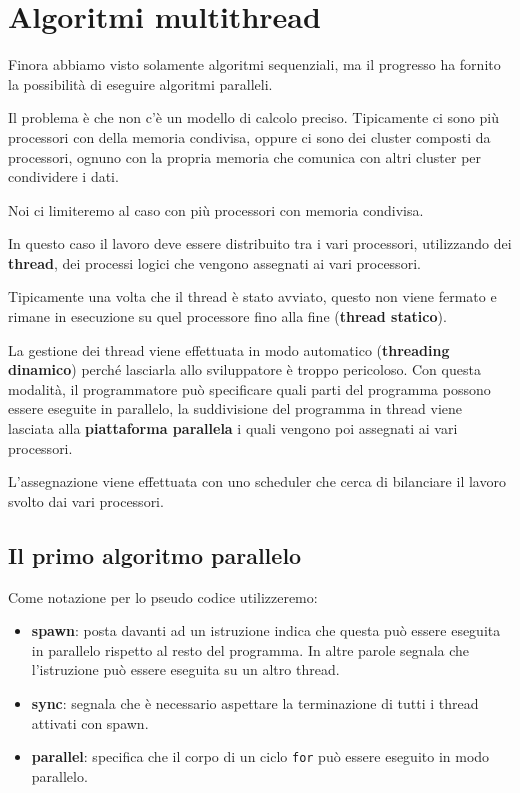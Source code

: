 \chapter{Algoritmi multithread}\label{algoritmi-multithread}

Finora abbiamo visto solamente algoritmi sequenziali, ma il progresso ha fornito la possibilità di eseguire algoritmi paralleli.

Il problema è che non c'è un modello di calcolo preciso. 
Tipicamente ci sono più processori con della memoria condivisa, oppure ci sono dei cluster composti da processori, ognuno con la propria memoria che comunica con altri cluster per condividere i dati.

Noi ci limiteremo al caso con più processori con memoria condivisa.

In questo caso il lavoro deve essere distribuito tra i vari processori, utilizzando dei \textbf{thread}, dei processi logici che vengono assegnati ai vari processori.

Tipicamente una volta che il thread è stato avviato, questo non viene fermato e rimane in esecuzione su quel processore fino alla fine (\textbf{thread statico}).

La gestione dei thread viene effettuata in modo automatico (\textbf{threading dinamico}) perché lasciarla allo sviluppatore è troppo pericoloso. 
Con questa modalità, il programmatore può specificare quali parti del programma possono essere eseguite in parallelo, la suddivisione del programma in thread viene lasciata alla \textbf{piattaforma parallela} i quali vengono poi assegnati ai vari processori.

L'assegnazione viene effettuata con uno scheduler che cerca di bilanciare il lavoro svolto dai vari processori.

\section{Il primo algoritmo parallelo}\label{il-primo-algoritmo-parallelo}

Come notazione per lo pseudo codice utilizzeremo:

\begin{itemize}
\item
  \textbf{spawn}: posta davanti ad un istruzione indica che questa può essere eseguita in parallelo rispetto al resto del programma. In altre parole segnala che l'istruzione può essere eseguita su un altro thread.
\item
  \textbf{sync}: segnala che è necessario aspettare la terminazione di tutti i thread attivati con spawn.
\item
  \textbf{parallel}: specifica che il corpo di un ciclo \texttt{for} può essere eseguito in modo parallelo.
\end{itemize}

